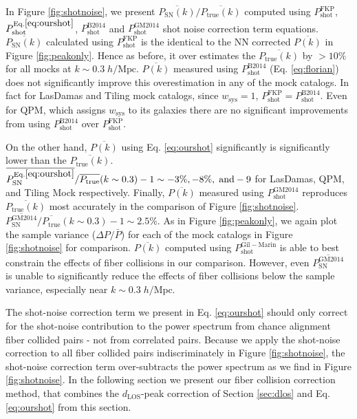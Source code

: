 \documentclass{emulateapj}
\begin{document}
In Figure \ref{fig:shotnoise}, we present $\overline{P_\mathrm{SN}(k)}/\overline{P_\mathrm{true}(k)}$ computed using $P^\mathrm{FKP}_\mathrm{shot}$, $P^\mathrm{Eq.\ref{eq:ourshot}}_\mathrm{shot}$, $P^\mathrm{B2014}_\mathrm{shot}$ and $P^\mathrm{GM2014}_\mathrm{shot}$ shot noise correction term equations. $\overline{P_\mathrm{SN}(k)}$ calculated using $P^\mathrm{FKP}_\mathrm{shot}$ is the identical to the NN corrected $\overline{P(k)}$ in Figure \ref{fig:peakonly}. Hence as before, it over estimates the $\overline{P_\mathrm{true}(k)}$ by $> 10 \%$ for all mocks at $k \sim 0.3 \; h/\mathrm{Mpc}$. $\overline{P(k)}$ measured using $P^\mathrm{B2014}_\mathrm{shot}$ (Eq. \ref{eq:florian}) does not significantly improve this overestimation in any of the mock catalogs. In fact for LasDamas and Tiling mock catalogs, since $w_\mathrm{sys} = 1$, $P^\mathrm{FKP}_\mathrm{shot} = P^\mathrm{B2014}_\mathrm{shot}$. Even for QPM, which assigns $w_\mathrm{sys}$ to its galaxies there are no significant improvements from using $P^\mathrm{B2014}_\mathrm{shot}$ over $P^\mathrm{FKP}_\mathrm{shot}$. 

On the other hand, $\overline{P(k)}$ using Eq. \ref{eq:ourshot} significantly is significantly lower than the $\overline{P_\mathrm{true}(k)}$. $\overline{P^\mathrm{Eq.\ref{eq:ourshot}}_\mathrm{SN}}/\overline{P_\mathrm{true}}(k\sim0.3) - 1 \sim -3 \%, -8 \%, \;\mathrm{and} -9$ for LasDamas, QPM, and Tiling Mock respectively. Finally, $\overline{P(k)}$ measured using $P^\mathrm{GM2014}_\mathrm{shot}$ reproduces $\overline{P_\mathrm{true}(k)}$ most accurately in the comparison of Figure \ref{fig:shotnoise}. $\overline{P^\mathrm{GM2014}_\mathrm{SN}}/\overline{P_\mathrm{true}}(k\sim 0.3) -1 \sim 2.5 \%$. As in Figure \ref{fig:peakonly}, we again plot the sample variance ($\Delta P/\bar{P}$) for each of the mock catalogs in Figure \ref{fig:shotnoise} for comparison. $\overline{P(k)}$ computed using $P^\mathrm{Gil-Marin}_\mathrm{shot}$ is able to best constrain the effects of fiber collisions in our comparison. However, even $\overline{P^\mathrm{GM2014}_\mathrm{SN}}$ is unable to significantly reduce the effects of fiber collisions below the sample variance, especially near $k \sim 0.3 \;h/\mathrm{Mpc}$. 

The shot-noise correction term we present in Eq. \ref{eq:ourshot} should only correct for the shot-noise contribution to the power spectrum from chance alignment fiber collided pairs - not from correlated pairs. Because we apply the shot-noise correction to all fiber collided pairs indiscriminately in Figure \ref{fig:shotnoise}, the shot-noise correction term over-subtracts the power spectrum as we find in Figure \ref{fig:shotnoise}. In the following section we present our fiber collision correction method, that combines the $d_\mathrm{LOS}$-peak correction of Section \ref{sec:dlos} and Eq. \ref{eq:ourshot} from this section. 
\end{document}
